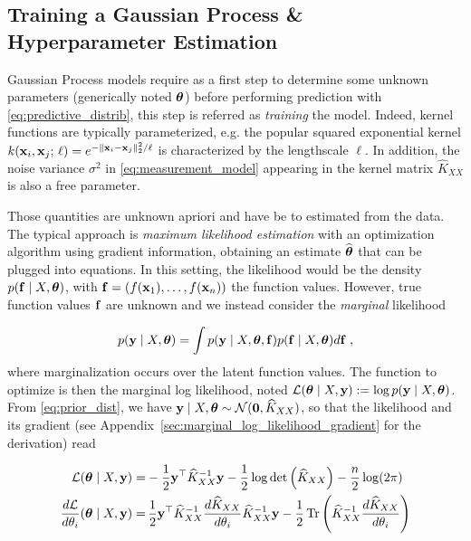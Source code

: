 \documentclass{article}
\begin{document}


\subsection{Training a Gaussian Process \& Hyperparameter Estimation}

Gaussian Process models require as a first step to determine some unknown parameters (generically noted $\boldsymbol{\mathbf{\theta}}$) before performing prediction with \eqref{eq:predictive_distrib}, this step is referred as \emph{training} the model.
Indeed, kernel functions are typically parameterized, e.g. the popular squared exponential kernel $k(\boldsymbol{\mathbf{x}}_i, \boldsymbol{\mathbf{x}}_j; \, \ell) = e^{-\Vert \boldsymbol{\mathbf{x}}_i - \boldsymbol{\mathbf{x}}_j \Vert_2^2 / \ell}$ is characterized by the lengthscale $\ell$. In addition, the noise variance $\sigma^2$ in \eqref{eq:measurement_model} appearing in the kernel matrix $\widehat K_{XX}$ is also a free parameter. 

Those quantities are unknown apriori and have be to estimated from the data. The typical approach is \emph{maximum likelihood estimation} with an optimization algorithm using gradient information, obtaining an estimate $\widehat {\boldsymbol{\mathbf{\theta}}}$ that can be plugged into equations. 
In this setting, the likelihood would be the density $p(\boldsymbol{\mathbf{f}} \mid X, \boldsymbol{\mathbf{\theta}})$, with $\boldsymbol{\mathbf{f}} = (f(\boldsymbol{\mathbf{x}}_1), \ldots, f(\boldsymbol{\mathbf{x}}_n))$ the function values. However, true function values $\boldsymbol{\mathbf{f}}$ are unknown and we instead consider the \emph{marginal} likelihood 

\begin{equation*}
    p( \boldsymbol{\mathbf{y}} \mid X, \boldsymbol{\mathbf{\theta}}) = \int p( \boldsymbol{\mathbf{y}} \mid X, \boldsymbol{\mathbf{\theta}}, \boldsymbol{\mathbf{f}}) p(\boldsymbol{\mathbf{f}} \mid X, \boldsymbol{\mathbf{\theta}}) d \boldsymbol{\mathbf{f}} \; ,
\end{equation*}
%
where marginalization occurs over the latent function values. 
The function to optimize is then the marginal log likelihood, noted $\mathcal L(\boldsymbol{\mathbf{\theta}} \mid X, \boldsymbol{\mathbf{y}}) := \log p(\boldsymbol{\mathbf{y}} \mid X, \boldsymbol{\mathbf{\theta}})$. From \eqref{eq:prior_dist}, we have $\boldsymbol{\mathbf{y}} \mid X, \boldsymbol{\mathbf{\theta}} \sim \mathcal N(\boldsymbol{\mathbf{0}}, \widehat K_{XX})$, so that the likelihood and its gradient (see Appendix~\ref{sec:marginal_log_likelihood_gradient} for the derivation)  read

\begin{align}
    \mathcal L(\boldsymbol{\mathbf{\theta}} \mid X, \boldsymbol{\mathbf{y}}) 
    =& - \frac 1 2 \boldsymbol{\mathbf{y}}^\top \widehat K_{XX}^{-1} \boldsymbol{\mathbf{y}} - \frac 1 2 \log \det \left( \widehat K_{XX} \right) - \frac n 2 \log(2\pi) \label{eq:marginal_log_likelihood}\\
    \frac{d \mathcal L}{d \theta_i} (\boldsymbol{\mathbf{\theta}} \mid X, \boldsymbol{\mathbf{y}}) 
    =& \, \frac 1 2 \boldsymbol{\mathbf{y}}^\top \widehat K_{XX}^{-1} \frac{d \widehat K_{XX}}{d\theta_i} \widehat K_{XX}^{-1} \boldsymbol{\mathbf{y}} - \frac 1 2 \operatorname{Tr} \left( \widehat K_{XX}^{-1} \frac{d \widehat K_{XX}}{d\theta_i} \right) \label{eq:marginal_log_likelihood_gradient}
\end{align}
\end{document}
